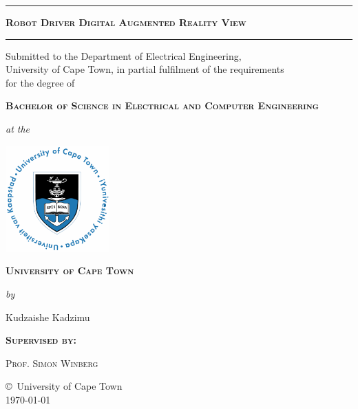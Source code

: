 \documentclass[a4paper, 12pt, onecolumn, twoside]{report}
\begin{document}
\begin{titlepage}
\begin{center}
\vspace*{-1cm} %

\hrule
\vspace*{0.3cm}

{\Large\bfseries\scshape Robot Driver Digital Augmented Reality View}

\vspace*{0.4cm}
\hrule
\vspace*{0.5cm}

{\small
\textsf{Submitted to the Department of Electrical Engineering,\\
University of Cape Town, in partial fulfilment of the requirements\\
for the degree of}
\vspace*{0.3cm}

{\scshape\bfseries Bachelor of Science in Electrical and Computer Engineering}
\vspace*{0.3cm}

\emph{at the}
\vspace*{0.3cm}

\includegraphics[width=4cm]{uctlogomain.png}
\vspace*{0.3cm}

{\scshape\bfseries University of Cape Town}
\vspace*{0.3cm}





\emph{by}

\vspace*{0.3cm}

{\textsf{Kudzaishe Kadzimu}}
}

\vspace*{0.6cm}
{\scshape{\bfseries Supervised by:}}
\vspace*{0.3cm}

{\scshape Prof. Simon Winberg}

\vfill



\copyright\ University of Cape Town \\
{\textsf \today}
\end{center}
\end{titlepage}
\end{document}
